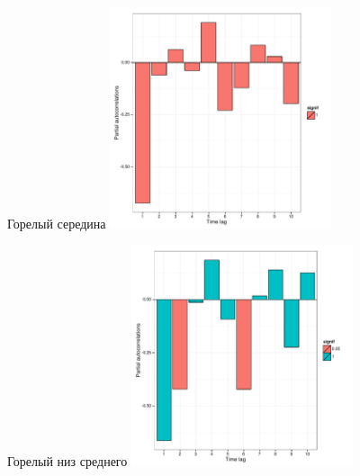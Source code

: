 \documentclass[12pt, a4paper]{disser}
\begin{document}
\begin{figure}[ht]
	\begin{minipage}[b]{.46\linewidth}
	\begin{center}
	{\tiny Горелый середина}
	\includegraphics[width=65mm]{../White_Sea/oneyear_all_Kandalaksha_all/perm_PRCF_Goreliy_middle_N1y.pdf}
	\end{center}
	\end{minipage}
%
	\hfil %
%
	\begin{minipage}[b]{.46\linewidth}
	\begin{center}	
	{\tiny Горелый низ среднего}
	\includegraphics[width=65mm]{../White_Sea/oneyear_all_Kandalaksha_all/perm_PRCF_Goreliy_midlow_N1y.pdf}
	\end{center}
	\end{minipage}



\end{figure}
\end{document}
